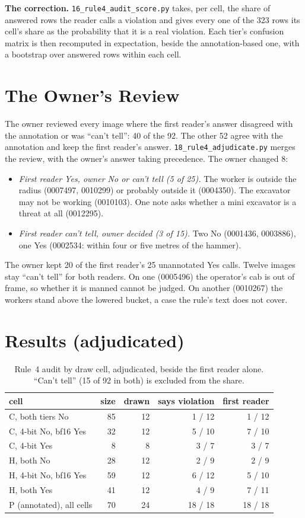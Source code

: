 \textbf{The correction.} \texttt{16\_rule4\_audit\_score.py} takes, per cell, the share of answered rows the
reader calls a violation and gives every one of the 323 rows its cell's share as the probability that it
is a real violation. Each tier's confusion matrix is then recomputed in expectation, beside the
annotation-based one, with a bootstrap over answered rows within each cell.

\section{The Owner's Review}

The owner reviewed every image where the first reader's answer disagreed with the annotation or was
``can't tell'': 40 of the 92. The other 52 agree with the annotation and keep the first reader's answer.
\texttt{18\_rule4\_adjudicate.py} merges the review, with the owner's answer taking precedence. The owner
changed 8:
\begin{itemize}
\item \emph{First reader Yes, owner No or can't tell (5 of 25).} The worker is outside the radius
(0007497, 0010299) or probably outside it (0004350). The excavator may not be working (0010103). One
note asks whether a mini excavator is a threat at all (0012295).
\item \emph{First reader can't tell, owner decided (3 of 15).} Two No (0001436, 0003886), one Yes
(0002534: within four or five metres of the hammer).
\end{itemize}
The owner kept 20 of the first reader's 25 unannotated Yes calls. Twelve images stay ``can't tell'' for
both readers. On one (0005496) the operator's cab is out of frame, so whether it is manned cannot be
judged. On another (0010267) the workers stand above the lowered bucket, a case the rule's text does not
cover.

\section{Results (adjudicated)}

\begin{table}[tbp]
\centering
\begin{tabular}{lrrrr}
\toprule
cell & size & drawn & says violation & first reader \\
\midrule
C, both tiers No & 85 & 12 & 1 / 12 & 1 / 12 \\
C, 4-bit No, bf16 Yes & 32 & 12 & 5 / 10 & 7 / 10 \\
C, 4-bit Yes & 8 & 8 & 3 / 7 & 3 / 7 \\
H, both No & 28 & 12 & 2 / 9 & 2 / 9 \\
H, 4-bit No, bf16 Yes & 59 & 12 & 6 / 12 & 5 / 10 \\
H, both Yes & 41 & 12 & 4 / 9 & 7 / 11 \\
P (annotated), all cells & 70 & 24 & 18 / 18 & 18 / 18 \\
\bottomrule
\end{tabular}
\caption{Rule~4 audit by draw cell, adjudicated, beside the first reader alone. ``Can't tell'' (15 of 92
in both) is excluded from the share.}
\label{tab:s27cells}
\end{table}

